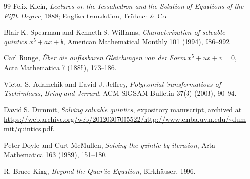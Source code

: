 \begin{thebibliography}{99}
Felix Klein,
\emph{Lectures on the Icosahedron and the Solution of Equations of the Fifth Degree},
1888; English translation, Trübner \& Co.

Blair K. Spearman and Kenneth S. Williams,
\emph{Characterization of solvable quintics \(x^5+ax+b\)},
American Mathematical Monthly 101 (1994), 986--992.

Carl Runge,
\emph{Über die auflösbaren Gleichungen von der Form \(x^5+ux+v=0\)},
Acta Mathematica 7 (1885), 173--186.

Victor S. Adamchik and David J. Jeffrey,
\emph{Polynomial transformations of Tschirnhaus, Bring and Jerrard},
ACM SIGSAM Bulletin 37(3) (2003), 90--94.

David S. Dummit,
\emph{Solving solvable quintics}, expository manuscript,
archived at
\url{https://web.archive.org/web/20120307005522/http://www.emba.uvm.edu/~dummit/quintics.pdf}.

Peter Doyle and Curt McMullen,
\emph{Solving the quintic by iteration},
Acta Mathematica 163 (1989), 151--180.

R. Bruce King,
\emph{Beyond the Quartic Equation},
Birkhäuser, 1996.

\end{thebibliography}
